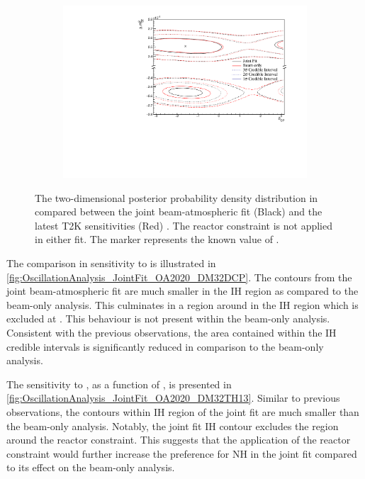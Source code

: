 \begin{figure}[h]
  \begin{subfigure}[t]{0.98\textwidth}
    \includegraphics[width=\textwidth, trim={0mm 0mm 0mm 0mm}, clip,page=1]{Figures/OA/JointFit_OA2020_Comp/ContourComparison_2D_dcp_dm32_BH_1_woRC_UnSmeared_CredibleInterval.pdf}
  \end{subfigure}
  \caption{The two-dimensional posterior probability density distribution in  compared between the joint beam-atmospheric fit (Black) and the latest T2K sensitivities (Red) \cite{Dunne2020-uf, t2k_tn_393}. The reactor constraint is not applied in either fit. The marker represents the known value of .}
  \label{fig:OscillationAnalysis_JointFit_OA2020_DM32DCP}
\end{figure}

The comparison in sensitivity to  is illustrated in \autoref{fig:OscillationAnalysis_JointFit_OA2020_DM32DCP}. The contours from the joint beam-atmospheric fit are much smaller in the IH region as compared to the beam-only analysis. This culminates in a region around  in the IH region which is excluded at \quickmath{3\sigma}. This behaviour is not present within the beam-only analysis. Consistent with the previous observations, the area contained within the IH credible intervals is significantly reduced in comparison to the beam-only analysis.

The sensitivity to , as a function of , is presented in \autoref{fig:OscillationAnalysis_JointFit_OA2020_DM32TH13}. Similar to previous observations, the  contours within IH region of the joint fit are much smaller than the beam-only analysis. Notably, the joint fit IH \quickmath{1\sigma} contour excludes the region around the reactor constraint. This suggests that the application of the reactor constraint would further increase the preference for NH in the joint fit compared to its effect on the beam-only analysis.

